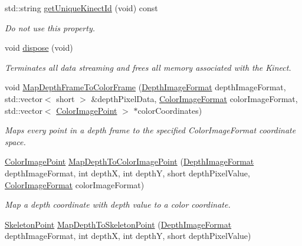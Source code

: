 \begin{DoxyCompactItemize}
std\-::string \hyperlink{class_kinect_sensor_a91d6feb6ef199bb80b4166059934e19c}{get\-Unique\-Kinect\-Id} (void) const 
\begin{DoxyCompactList}\small\item\em \-Do not use this property. \end{DoxyCompactList}\item 
\hypertarget{class_kinect_sensor_a81aa6180ab4bed59e83b5e1bd4e60ebb}{void \hyperlink{class_kinect_sensor_a81aa6180ab4bed59e83b5e1bd4e60ebb}{dispose} (void)}\label{class_kinect_sensor_a81aa6180ab4bed59e83b5e1bd4e60ebb}

\begin{DoxyCompactList}\small\item\em \-Terminates all data streaming and frees all memory associated with the \-Kinect. \end{DoxyCompactList}\item 
void \hyperlink{class_kinect_sensor_a8967dc608f839c287364f35915e6d1f1}{\-Map\-Depth\-Frame\-To\-Color\-Frame} (\hyperlink{depth_image_format_8h_a00bd0eac7784357ebca4c1e6a50b51af}{\-Depth\-Image\-Format} depth\-Image\-Format, std\-::vector$<$ short $>$ \&depth\-Pixel\-Data, \hyperlink{color_image_format_8h_a77f719572c3c368859dd2ec3153d8452}{\-Color\-Image\-Format} color\-Image\-Format, std\-::vector$<$ \hyperlink{class_color_image_point}{\-Color\-Image\-Point} $>$ $\ast$color\-Coordinates)
\begin{DoxyCompactList}\small\item\em \-Maps every point in a depth frame to the specified \-Color\-Image\-Format coordinate space. \end{DoxyCompactList}\item 
\hyperlink{class_color_image_point}{\-Color\-Image\-Point} \hyperlink{class_kinect_sensor_a6a227ba5603eeeed31099ed5137362c5}{\-Map\-Depth\-To\-Color\-Image\-Point} (\hyperlink{depth_image_format_8h_a00bd0eac7784357ebca4c1e6a50b51af}{\-Depth\-Image\-Format} depth\-Image\-Format, int depth\-X, int depth\-Y, short depth\-Pixel\-Value, \hyperlink{color_image_format_8h_a77f719572c3c368859dd2ec3153d8452}{\-Color\-Image\-Format} color\-Image\-Format)
\begin{DoxyCompactList}\small\item\em \-Map a depth coordinate with depth value to a color coordinate. \end{DoxyCompactList}\item 
\hyperlink{class_skeleton_point}{\-Skeleton\-Point} \hyperlink{class_kinect_sensor_a29a6ac16153328c7a8268bcca406b6a5}{\-Map\-Depth\-To\-Skeleton\-Point} (\hyperlink{depth_image_format_8h_a00bd0eac7784357ebca4c1e6a50b51af}{\-Depth\-Image\-Format} depth\-Image\-Format, int depth\-X, int depth\-Y, short depth\-Pixel\-Value)

\end{DoxyCompactItemize}
